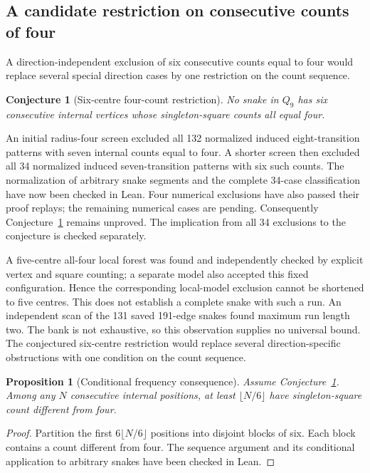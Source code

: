 \documentclass[11pt,a4paper]{article}
\newtheorem{proposition}[theorem]{Proposition}
\newtheorem{conjecture}[theorem]{Conjecture}
\theoremstyle{definition}
\theoremstyle{remark}
\newcommand{\Q}{Q}
\begin{document}
\subsection{A candidate restriction on consecutive counts of four}\label{sec:four-run}
A direction-independent exclusion of six consecutive counts equal to four would replace several special direction cases by one restriction on the count sequence.
\begin{conjecture}[Six-centre four-count restriction]\label{conj:six-fours}
No snake in $\Q_9$ has six consecutive internal vertices whose singleton-square counts all equal four.
\end{conjecture}
An initial radius-four screen excluded all 132 normalized induced eight-transition patterns with seven internal counts equal to four. A shorter screen then excluded all 34 normalized induced seven-transition patterns with six such counts. The normalization of arbitrary snake segments and the complete 34-case classification have now been checked in Lean. Four numerical exclusions have also passed their proof replays; the remaining numerical cases are pending. Consequently Conjecture~\ref{conj:six-fours} remains unproved. The implication from all 34 exclusions to the conjecture is checked separately.

A five-centre all-four local forest was found and independently checked by explicit vertex and square counting; a separate model also accepted this fixed configuration. Hence the corresponding local-model exclusion cannot be shortened to five centres. This does not establish a complete snake with such a run. An independent scan of the 131 saved 191-edge snakes found maximum run length two. The bank is not exhaustive, so this observation supplies no universal bound. The conjectured six-centre restriction would replace several direction-specific obstructions with one condition on the count sequence.

\begin{proposition}[Conditional frequency consequence]
Assume Conjecture~\ref{conj:six-fours}. Among any $N$ consecutive internal positions, at least $\lfloor N/6\rfloor$ have singleton-square count different from four.
\end{proposition}
\begin{proof}
Partition the first $6\lfloor N/6\rfloor$ positions into disjoint blocks of six. Each block contains a count different from four. The sequence argument and its conditional application to arbitrary snakes have been checked in Lean.
\end{proof}
\end{document}
